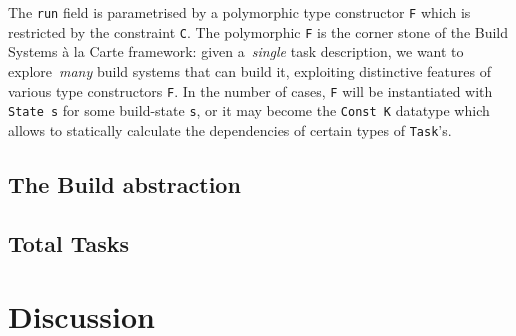 \documentclass[sigplan,review]{acmart}\settopmatter{printfolios=true,printccs=false,printacmref=false}
\newcommand{\hs}{\texttt}
\begin{document}
The \hs{run} field is parametrised by a
polymorphic type constructor \hs{F} which is restricted by the constraint \hs{C}.
The polymorphic \hs{F} is the corner stone of the Build Systems \`a la Carte
framework: given a~\emph{single} task description, we want to explore~\emph{many}
build systems that can build it, exploiting distinctive features of various
type constructors \hs{F}. In the number of cases, \hs{F} will be instantiated
with \hs{State s} for some build-state \hs{s}, or it may become the
\hs{Const K} datatype which allows to statically calculate the dependencies of certain
types of \hs{Task}'s.

\subsection{The Build abstraction}

\subsection{Total Tasks}


\section{Discussion}\label{sec-discussion}








\end{document}
